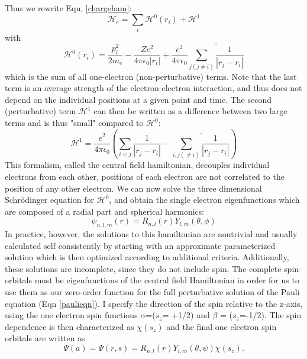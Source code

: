 Thus we rewrite Eqn, \ref{chargeham}:
 \begin{equation}
\mathscr{H}_e = \sum_i\mathscr{H}^0\left(r_i\right)+\mathscr{H}^1
\end{equation}	
with
\begin{equation}
\mathscr{H}^0\left(r_i\right) = \frac{p_i^2}{2m_e} - \frac{Ze^2}{4\pi\epsilon_0|r_i|}+\frac{e^2}{4\pi\epsilon_0}\overline{\sum_{j(j\neq i)}\frac{1}{|r_j-r_i|}}
\end{equation}
which is the sum of all one-electron (non-perturbative) terms. Note that the last term is an average strength of the electron-electron interaction, and thus does not depend on the individual positions at a given point and time. The second (perturbative) term $\mathscr{H}^1$ can then be written as a difference between two large terms and is thus "small" compared to $\mathscr{H}^0$:
\begin{equation}
\mathscr{H}^1=\frac{e^2}{4\pi\epsilon_0}\left(\sum_{i<j}\frac{1}{|r_j-r_i|}-\overline{\sum_{i,j(\neq i)}\frac{1}{|r_j-r_i|}}\right)
\end{equation}
This formalism, called the central field hamiltonian, decouples individual electrons from each other, positions of each electron are not correlated to the position of any other electron. We can now solve the three dimensional Schr\"odinger equation for $\mathscr{H}^0$, and obtain the single electron eigenfunctions which are composed of a radial part and spherical harmonics:
\begin{equation}
\psi_{n,l,m}(r)=R_{n,l}(r)Y_{l,m}(\theta,\phi)
\end{equation}
In practice, however, the solutions to this hamiltonian are nontrivial and usually calculated self consistently by starting with an approximate parameterized solution which is then optimized according to additional criteria. Additionally, these solutions are incomplete, since they do not include spin. The complete spin-orbitals must be eigenfunctions of the central field Hamiltonian in order for us to use them as our zero-order function for the full perturbative solution of the Pauli equation (Eqn \ref{paulieqn}). I specify the direction of the spin relative to the z-axis, using the one electron spin functions $\alpha$=($s_z$= +1/2) and $\beta$ = ($s_z$=-1/2). The spin dependence is then characterized as $\chi(s_z)$ and the final one electron spin orbitals are written as
\begin{equation}
\Psi(a) = \Psi(r,s) = R_{n,l}(r)Y_{l,m}(\theta,\psi)\chi(s_z).
\end{equation}

